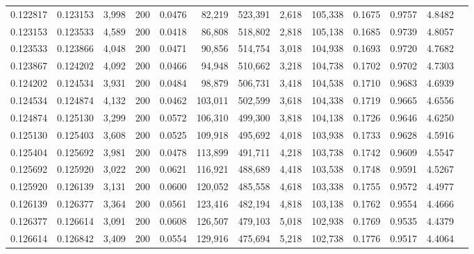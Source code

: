 \begin{tabular}{rrrrrrrrrrrrr}
0.122817 & 0.123153 &  3,998 & 200 &                                     0.0476 &  82,219 & 523,391 &   2,618 & 105,338 & 0.1675 & 0.9757 & 4.8482 \\
0.123153 & 0.123533 &  4,589 & 200 &                                     0.0418 &  86,808 & 518,802 &   2,818 & 105,138 & 0.1685 & 0.9739 & 4.8057 \\
0.123533 & 0.123866 &  4,048 & 200 &                                     0.0471 &  90,856 & 514,754 &   3,018 & 104,938 & 0.1693 & 0.9720 & 4.7682 \\
0.123867 & 0.124202 &  4,092 & 200 &                                     0.0466 &  94,948 & 510,662 &   3,218 & 104,738 & 0.1702 & 0.9702 & 4.7303 \\
0.124202 & 0.124534 &  3,931 & 200 &                                     0.0484 &  98,879 & 506,731 &   3,418 & 104,538 & 0.1710 & 0.9683 & 4.6939 \\
0.124534 & 0.124874 &  4,132 & 200 &                                     0.0462 & 103,011 & 502,599 &   3,618 & 104,338 & 0.1719 & 0.9665 & 4.6556 \\
0.124874 & 0.125130 &  3,299 & 200 &                                     0.0572 & 106,310 & 499,300 &   3,818 & 104,138 & 0.1726 & 0.9646 & 4.6250 \\
0.125130 & 0.125403 &  3,608 & 200 &                                     0.0525 & 109,918 & 495,692 &   4,018 & 103,938 & 0.1733 & 0.9628 & 4.5916 \\
0.125404 & 0.125692 &  3,981 & 200 &                                     0.0478 & 113,899 & 491,711 &   4,218 & 103,738 & 0.1742 & 0.9609 & 4.5547 \\
0.125692 & 0.125920 &  3,022 & 200 &                                     0.0621 & 116,921 & 488,689 &   4,418 & 103,538 & 0.1748 & 0.9591 & 4.5267 \\
0.125920 & 0.126139 &  3,131 & 200 &                                     0.0600 & 120,052 & 485,558 &   4,618 & 103,338 & 0.1755 & 0.9572 & 4.4977 \\
0.126139 & 0.126377 &  3,364 & 200 &                                     0.0561 & 123,416 & 482,194 &   4,818 & 103,138 & 0.1762 & 0.9554 & 4.4666 \\
0.126377 & 0.126614 &  3,091 & 200 &                                     0.0608 & 126,507 & 479,103 &   5,018 & 102,938 & 0.1769 & 0.9535 & 4.4379 \\
0.126614 & 0.126842 &  3,409 & 200 &                                     0.0554 & 129,916 & 475,694 &   5,218 & 102,738 & 0.1776 & 0.9517 & 4.4064 \\

\end{tabular}
